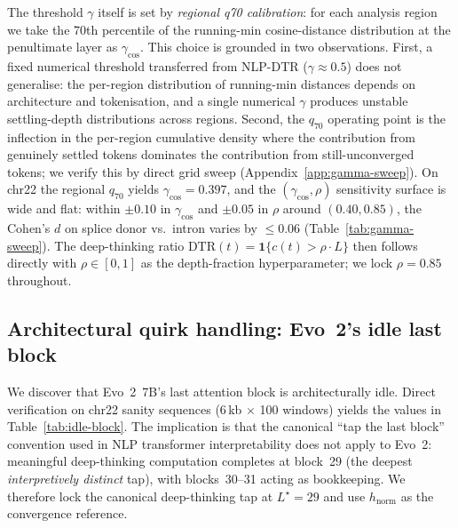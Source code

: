 \documentclass[12pt]{article}
\theoremstyle{plain}
\theoremstyle{definition}
\theoremstyle{remark}
\newcommand{\DTR}{\textsc{DTR}}
\newcommand{\hnorm}{h_{\mathrm{norm}}}
\begin{document}
The threshold $\gamma$ itself is set by \emph{regional q70 calibration}:
for each analysis region we take the 70th percentile of the running-min
cosine-distance distribution at the penultimate layer as $\gamma_{\cos}$.
This choice is grounded in two observations. First, a fixed numerical
threshold transferred from NLP-\DTR{} ($\gamma\approx 0.5$) does not
generalise: the per-region distribution of running-min distances
depends on architecture and tokenisation, and a single numerical
$\gamma$ produces unstable settling-depth distributions across regions.
Second, the $q_{70}$ operating point is the inflection in the
per-region cumulative density where the contribution from genuinely
settled tokens dominates the contribution from still-unconverged tokens;
we verify this by direct grid sweep (Appendix~\ref{app:gamma-sweep}). On
chr22 the regional $q_{70}$ yields $\gamma_{\cos}=0.397$, and the
$(\gamma_{\cos}, \rho)$ sensitivity surface is wide and flat: within
$\pm 0.10$ in $\gamma_{\cos}$ and $\pm 0.05$ in $\rho$ around
$(0.40, 0.85)$, the Cohen's $d$ on splice donor vs.\ intron varies by
$\le 0.06$ (Table~\ref{tab:gamma-sweep}). The deep-thinking ratio
$\mathrm{DTR}(t) = \mathbf{1}\{c(t) > \rho \cdot L\}$ then follows
directly with $\rho \in [0,1]$ as the depth-fraction hyperparameter; we
lock $\rho = 0.85$ throughout.

\subsection{Architectural quirk handling: Evo~2's idle last block}
\label{sec:idle-block}

We discover that Evo~2~7B's last attention block is architecturally
idle. Direct verification on chr22 sanity sequences (6\,kb $\times$ 100
windows) yields the values in Table~\ref{tab:idle-block}. The
implication is that the canonical ``tap the last block'' convention
used in NLP transformer interpretability does not apply to Evo~2:
meaningful deep-thinking computation completes at block~29 (the deepest
\emph{interpretively distinct} tap), with blocks~30--31 acting as
bookkeeping. We therefore lock the canonical deep-thinking tap at
$L^{\star}=29$ and use $\hnorm$ as the convergence reference.
\end{document}
